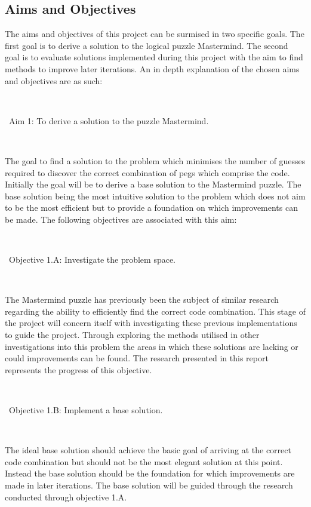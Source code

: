 \documentclass[11pt]{article}  %
\theoremstyle{definition}
\theoremstyle{remark}
\begin{document}
\subsection {Aims and Objectives}
The aims and objectives of this project can be surmised in two specific goals. The first goal is to derive a solution to the logical puzzle 
Mastermind. The second goal is to evaluate solutions implemented during this project with the aim to find methods to improve later 
iterations. An in depth explanation of the chosen aims and objectives are as such:

\

\textbullet\ Aim 1: To derive a solution to the puzzle Mastermind.

\

The goal to find a solution to the problem which minimises the number of guesses required to discover the correct combination of
pegs which comprise the code. Initially the goal will be to derive a base solution to the Mastermind puzzle. The base solution being the
most intuitive solution to the problem which does not aim to be the most efficient but to provide a foundation on which improvements
can be made. The following objectives are associated with this aim:

\

\textbullet\ Objective 1.A: Investigate the problem space.

\

The Mastermind puzzle has previously been the subject of similar research regarding the ability to efficiently find the correct code
combination. This stage of the project will concern itself with investigating these previous implementations to guide the project.
Through exploring the methods utilised in other investigations into this problem the areas in which these solutions are lacking or could
improvements can be found. The research presented in this report represents the progress of this objective.

\

\textbullet\ Objective 1.B:  Implement a base solution.

\

The ideal base solution should achieve the basic goal of arriving at the correct code combination but should not be the most elegant
solution at this point. Instead the base solution should be the foundation for which improvements are made in later iterations.
The base solution will be guided through the research conducted through objective 1.A.
\end{document}
